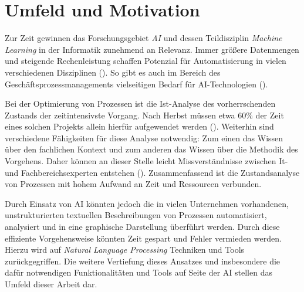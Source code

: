 \section{Umfeld und Motivation}

Zur Zeit gewinnen das Forschungsgebiet \textit{\ac{AI}} und dessen Teildisziplin \textit{Machine Learning} in der Informatik zunehmend an Relevanz. Immer größere Datenmengen und steigende Rechenleistung schaffen Potenzial für Automatisierung in vielen verschiedenen Disziplinen (\cite[vgl.][1]{AIRELEVANCE}). So gibt es auch im Bereich des Geschäftsprozessmanagements vielseitigen Bedarf für AI-Technologien (\cite[vgl.][1]{BPMAIRELEVANCE}).\par
Bei der Optimierung von Prozessen ist die Ist-Analyse des vorherrschenden Zustands der zeitintensivste Vorgang. Nach Herbst müssen etwa 60\% der Zeit eines solchen Projekts allein hierfür aufgewendet werden (\cite[vgl.][1]{HERBST}). 
Weiterhin sind verschiedene Fähigkeiten für diese Analyse notwendig: Zum einen das Wissen über den fachlichen Kontext und zum anderen das Wissen über die Methodik des Vorgehens. Daher können an dieser Stelle leicht Missverständnisse zwischen It- und Fachbereichsexperten entstehen (\cite[vgl.][1]{HERBST}). Zusammenfassend ist die Zustandsanalyse von Prozessen mit hohem Aufwand an Zeit und Ressourcen verbunden.\par
Durch Einsatz von \ac{AI} könnten jedoch die in vielen Unternehmen vorhandenen, unstrukturierten textuellen Beschreibungen von Prozessen automatisiert, analysiert und in eine graphische Darstellung überführt werden. Durch diese effiziente Vorgehensweise könnten Zeit gespart und Fehler vermieden werden. Hierzu wird auf \textit{Natural Language Processing} Techniken und Tools zurückgegriffen. Die weitere Vertiefung dieses Ansatzes und insbesondere die dafür notwendigen Funktionalitäten und Tools auf Seite der \ac{AI} stellen das Umfeld dieser Arbeit dar.

